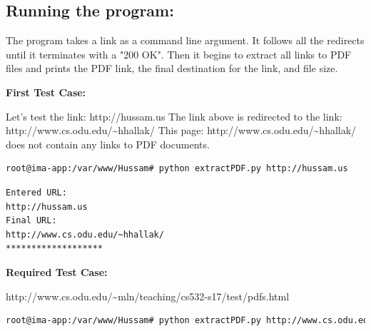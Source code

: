 \documentclass[a4paper, 11pt]{article}
\begin{document}
\subsection*{Running the program:}
The program takes a link as a command line argument. It follows all the redirects until it terminates with a "200 OK". Then it begins to extract all links to PDF files and prints the PDF link, the final destination for the link, and file size. 

\noindent
\textbf{First Test Case:}

Let's test the link: 
\newline
http://hussam.us 
\newline
The link above is redirected to the link:
\newline
http://www.cs.odu.edu/\textasciitilde hhallak/
\newline
\noindent
This page: http://www.cs.odu.edu/\textasciitilde hhallak/ does not contain any links to PDF documents.
\begin{lstlisting}[language=bash,label=Command:,caption=Command:]
root@ima-app:/var/www/Hussam# python extractPDF.py http://hussam.us
\end{lstlisting}

\begin{lstlisting}[language=bash,label=Output,caption=Output:]
Entered URL:
http://hussam.us
Final URL:
http://www.cs.odu.edu/~hhallak/
*******************
\end{lstlisting}

\noindent
\textbf{Required Test Case:}

http://www.cs.odu.edu/\textasciitilde mln/teaching/cs532-s17/test/pdfs.html
\begin{lstlisting}[language=bash,label=Command:,caption=Command:]
root@ima-app:/var/www/Hussam# python extractPDF.py http://www.cs.odu.edu/~mln/teaching/cs532-s17/test/pdfs.html
\end{lstlisting}
\end{document}
